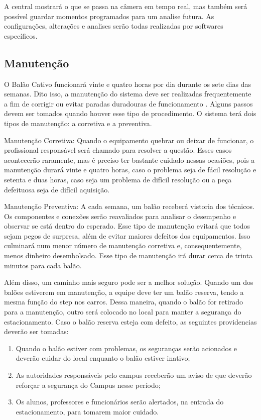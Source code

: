 	A central mostrará o que se passa na câmera em tempo real, mas também será possível guardar momentos programados para um analise futura. As configurações, alterações e analises serão todas realizadas por softwares específicos.

	\subsection{Manutenção}

		O Balão Cativo funcionará vinte e quatro horas por dia durante os sete dias das semanas. Dito isso, a manutenção do sistema deve ser realizadas frequentemente a fim de corrigir ou evitar paradas duradouras de funcionamento . Alguns passos devem ser tomados quando houver esse tipo de procedimento. O sistema terá dois tipos de manutenção: a corretiva e a preventiva.

		Manutenção Corretiva: Quando o equipamento quebrar ou deixar de funcionar, o profissional responsável será chamado para resolver a questão. Esses casos acontecerão raramente, mas é preciso ter bastante cuidado nessas ocasiões, pois a manutenção durará vinte e quatro horas, caso o problema seja de fácil resolução e setenta e duas horas, caso seja um problema de difícil resolução ou a peça defeituosa seja de difícil aquisição.

		Manutenção Preventiva: A cada semana, um balão receberá vistoria dos técnicos. Os componentes e conexões serão reavaliados para analisar o desempenho e observar se está dentro do esperado. Esse tipo de manutenção evitará que todos sejam pegos de surpresa, além de evitar maiores defeitos dos equipamentos. Isso culminará num menor número de manutenção corretiva e, consequentemente, menos dinheiro desembolsado.
		Esse tipo de manutenção irá durar cerca de trinta minutos para cada balão.

		Além disso, um caminho mais seguro pode ser a melhor solução. Quando um dos balões estiverem em manutenção, a equipe deve ter um balão reserva, tendo a mesma função do step nos carros. Dessa maneira, quando o balão for retirado para a manutenção, outro será colocado no local para manter a segurança do estacionamento. Caso o balão reserva esteja com defeito, as seguintes providencias deverão ser tomadas:

		\begin{enumerate}
				\item Quando o balão estiver com problemas, os seguranças serão acionados e deverão cuidar do local enquanto o balão estiver inativo;
				\item As autoridades responsáveis pelo campus receberão um aviso de que deverão reforçar a segurança do Campus nesse período;
				\item Os alunos, professores e funcionários serão alertados, na entrada do estacionamento, para tomarem maior cuidado.~\cite{resolvemicro}
		\end{enumerate}


